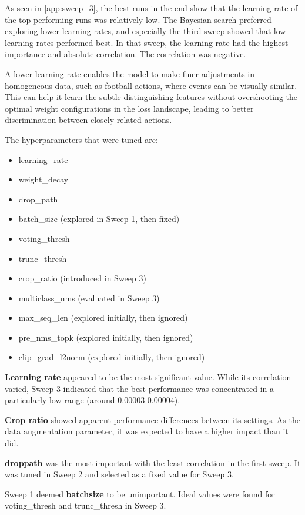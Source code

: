 As seen in \autoref{app:sweep_3}, the best runs in the end show that the learning rate of the top-performing runs was relatively low. The Bayesian search preferred exploring lower learning rates, and especially the third sweep showed that low learning rates performed best. In that sweep, the learning rate had the highest importance and absolute correlation. The correlation was negative. 

A lower learning rate enables the model to make finer adjustments in homogeneous data, such as football actions, where events can be visually similar. This can help it learn the subtle distinguishing features without overshooting the optimal weight configurations in the loss landscape, leading to better discrimination between closely related actions.


The hyperparameters that were tuned are:
\begin{itemize}
    \item learning\_rate
    \item weight\_decay
    \item drop\_path 
    \item batch\_size (explored in Sweep 1, then fixed)
    \item voting\_thresh
    \item trunc\_thresh
    \item crop\_ratio (introduced in Sweep 3)
    \item multiclass\_nms (evaluated in Sweep 3)
    \item max\_seq\_len (explored initially, then ignored)
    \item pre\_nms\_topk (explored initially, then ignored)
    \item clip\_grad\_l2norm (explored initially, then ignored)
\end{itemize}

\textbf{Learning rate} appeared to be the most significant value. While its correlation varied, Sweep 3 indicated that the best performance was concentrated in a particularly low range (around 0.00003-0.00004). 

\textbf{Crop ratio} showed apparent performance differences between its settings. As the data augmentation parameter, it was expected to have a higher impact than it did. 

\textbf{droppath} was the most important with the least correlation in the first sweep. It was tuned in Sweep 2 and selected as a fixed value for Sweep 3. 

Sweep 1 deemed \textbf{batchsize} to be unimportant. Ideal values were found for voting\_thresh and trunc\_thresh in Sweep 3. 

